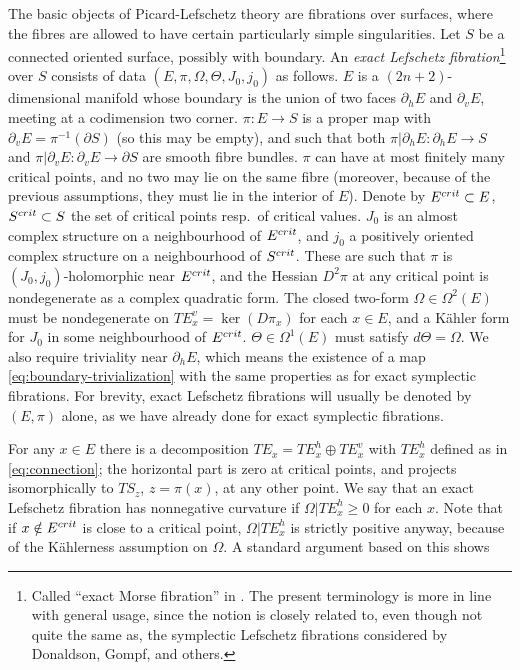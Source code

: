 \documentclass[10pt,letterpaper]{article}
\begin{document}
The basic objects of Picard-Lefschetz theory are fibrations over surfaces,
where the fibres are allowed to have certain particularly simple singularities.
Let $S$ be a connected oriented surface, possibly with boundary. An {\em exact
Lefschetz fibration}\footnote{Called ``exact Morse fibration'' in
\cite{seidel00}. The present terminology is more in line with general usage,
since the notion is closely related to, even though not quite the same as, the
symplectic Lefschetz fibrations considered by Donaldson, Gompf, and others.}
over $S$ consists of data $(E,\pi,\Omega,\Theta,J_0,j_0)$ as follows. $E$ is a
$(2n+2)$-dimensional manifold whose boundary is the union of two faces
$\partial_hE$ and $\partial_vE$, meeting at a codimension two corner. $\pi: E
\rightarrow S$ is a proper map with $\partial_vE = \pi^{-1}(\partial S)$ (so
this may be empty), and such that both $\pi|\partial_hE: \partial_hE
\rightarrow S$ and $\pi|\partial_vE: \partial_vE \rightarrow \partial S$ are
smooth fibre bundles. $\pi$ can have at most finitely many critical points, and
no two may lie on the same fibre (moreover, because of the previous
assumptions, they must lie in the interior of $E$). Denote by $E^{crit} \subset
E$, $S^{crit} \subset S$ the set of critical points resp.\ of critical values.
$J_0$ is an almost complex structure on a neighbourhood of $E^{crit}$, and $j_0$
a positively oriented complex structure on a neighbourhood of $S^{crit}$. These
are such that $\pi$ is $(J_0,j_0)$-holomorphic near $E^{crit}$, and the Hessian
$D^2\pi$ at any critical point is nondegenerate as a complex quadratic form.
The closed two-form $\Omega \in \Omega^2(E)$ must be nondegenerate on $TE_x^v =
\ker(D\pi_x)$ for each $x \in E$, and a K{\"a}hler form for $J_0$ in some
neighbourhood of $E^{crit}$. $\Theta \in \Omega^1(E)$ must satisfy $d\Theta =
\Omega$. We also require triviality near $\partial_hE$, which means the
existence of a map \eqref{eq:boundary-trivialization} with the same properties
as for exact symplectic fibrations. For brevity, exact Lefschetz fibrations
will usually be denoted by $(E,\pi)$ alone, as we have already done for exact
symplectic fibrations.

For any $x \in E$ there is a decomposition $TE_x = TE^h_x \oplus TE^v_x$ with
$TE^h_x$ defined as in \eqref{eq:connection}; the horizontal part is zero at
critical points, and projects isomorphically to $TS_z$, $z = \pi(x)$, at any
other point. We say that an exact Lefschetz fibration has nonnegative curvature
if $\Omega|TE^h_x \geq 0$ for each $x$. Note that if $x \notin E^{crit}$ is
close to a critical point, $\Omega|TE^h_x$ is strictly positive anyway, because
of the K{\"a}hlerness assumption on $\Omega$. A standard argument based on this
shows
\end{document}
